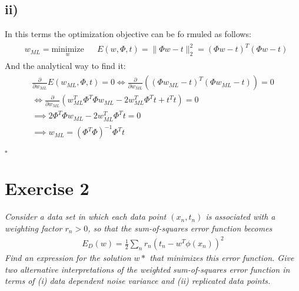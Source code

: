 \documentclass[11pt]{scrartcl} %
\begin{document}
         \subsection*{ii)}
         In this terms the optimization objective can be fo
         rmuled as follows:
         \begin{align*}
           \begin{aligned}
             & w_{ML} = \underset{w}{\text{minimize}}
             & & E(w, \Phi, t) = \lVert \Phi w - t \rVert_2^2 = (\Phi w - t)^T(\Phi w - t)
           \end{aligned}
         \end{align*}
         And the analytical way to find it:
         \begin{align*}
           \begin{aligned}
             \frac{\partial}{\partial w_{ML}}  E (w_{ML}, \Phi, t) = 0 \iff \frac{\partial}{\partial w_{ML}} \left((\Phi w_{ML} - t)^T(\Phi w_{ML} - t) \right) = 0\\
             \iff \frac{\partial}{\partial w_{ML}} \left(w_{ML}^T\Phi^T\Phi w_{ML} - 2w_{ML}^T\Phi^Tt+t^Tt \right) = 0\\
             \implies 2\Phi^T\Phi w_{ML} - 2w_{ML}^T\Phi^Tt = 0 \\
             \implies w_{ML} = (\Phi^T\Phi)^{-1}\Phi^Tt
           \end{aligned}
         \end{align*}
         \begin{flushright}
           $\square$\\
         \end{flushright}










         

\vspace{5mm}
\section*{Exercise 2}
         {\it Consider a data set in which each data point \((x_n, t_n)\) is associated with a weighting factor \(r_n>0\), so that the sum-of-squares error function becomes
           \begin{align*}
             E_D(w) = \frac{1}{2}\sum_{n} r_n(t_n-w^T\phi(x_n))^2
           \end{align*}
           Find an expression for the solution \(w*\) that minimizes this error function. Give two alternative interpretations of the weighted sum-of-squares error function in terms of (i) data dependent noise variance and (ii) replicated data points.}
         
\end{document}
